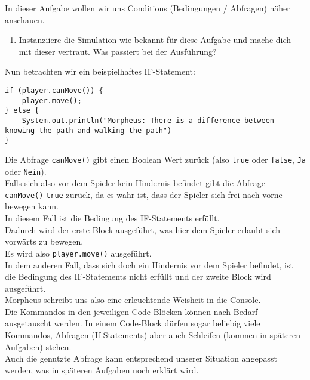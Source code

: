 

In dieser Aufgabe wollen wir uns Conditions (Bedingungen / Abfragen) näher anschauen.

\begin{enumerate}                           
    \item Instanziiere die Simulation wie bekannt für diese Aufgabe und mache dich mit dieser vertraut.
        Was passiert bei der Ausführung?
\end{enumerate}


\begin{Infobox}[IF-Condition]
    Nun betrachten wir ein beispielhaftes IF-Statement:

    \begin{lstlisting}[breaklines=true, numbers=none]
if (player.canMove()) {
    player.move();
} else {
    System.out.println("Morpheus: There is a difference between knowing the path and walking the path")
}
    \end{lstlisting}

    Die Abfrage \lstinline{canMove()} gibt einen Boolean Wert zurück (also \lstinline{true} oder \lstinline{false}, \texttt{Ja} oder \texttt{Nein}).\\
    Falls sich also vor dem Spieler kein Hindernis befindet gibt die Abfrage \lstinline{canMove()} \lstinline{true} zurück, da es wahr ist, dass der Spieler sich frei nach vorne bewegen kann.\\
    In diesem Fall ist die Bedingung des IF-Statements erfüllt.\\
    Dadurch wird der erste Block ausgeführt, was hier dem Spieler erlaubt sich vorwärts zu bewegen.\\
    Es wird also \lstinline{player.move()} ausgeführt.\\

    In dem anderen Fall, dass sich doch ein Hindernis vor dem Spieler befindet, ist die Bedingung des IF-Statements nicht erfüllt und der zweite Block wird ausgeführt.\\
    Morpheus schreibt uns also eine erleuchtende Weisheit in die Console.\\

    Die Kommandos in den jeweiligen Code-Blöcken können nach Bedarf ausgetauscht werden.
    In einem Code-Block dürfen sogar beliebig viele Kommandos, Abfragen (If-Statements) aber auch Schleifen (kommen in späteren Aufgaben) stehen.\\
    Auch die genutzte Abfrage kann entsprechend unserer Situation angepasst werden, was in späteren Aufgaben noch erklärt wird.
\end{Infobox}


